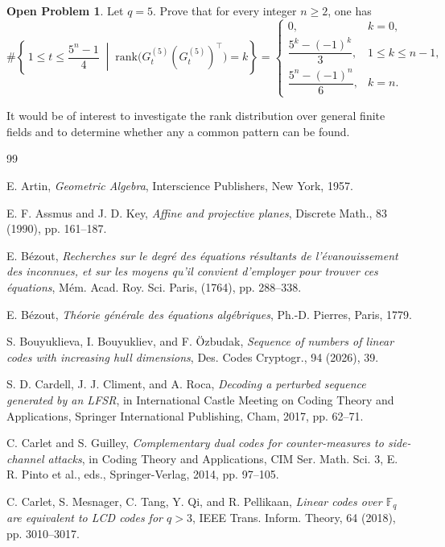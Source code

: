 \documentclass[hidelinks,onefignum,onetabnum]{siamart251216}
\theoremstyle{definition}
\newtheorem{open}[theorem]{Open Problem}
\theoremstyle{remark}
\providecommand{\rank}{{\mathrm{rank}}}
\begin{document}
\begin{open}
Let $q=5$. Prove that for every integer $n\ge 2$, one has
	\[
	\#\left\{\,1\le t\le \frac{5^n-1}{4} \;\middle|\; \rank\!\bigl(G_t^{(5)}(G_t^{(5)})^\top\bigr)=k \right\}
	=
	\begin{cases}
		0, & k=0,\\[1ex]
		\dfrac{5^k-(-1)^k}{3}, & 1\le k\le n-1,\\[2ex]
		\dfrac{5^n-(-1)^n}{6}, & k=n.
	\end{cases}
	\]
\end{open}

It would be of interest to investigate the rank distribution over general finite fields and to determine whether any a common pattern can be found.
	

\begin{thebibliography}{99}
	
	E. Artin, \emph{Geometric Algebra}, Interscience Publishers, New York, 1957.
	
	E. F. Assmus and J. D. Key, \emph{Affine and projective planes}, Discrete Math., 83 (1990), pp. 161--187.
	
	E. B{\'e}zout, \emph{Recherches sur le degr{\'e} des {\'e}quations r{\'e}sultants de l'{\'e}vanouissement des inconnues, et sur les moyens qu'il convient d'employer pour trouver ces {\'e}quations}, M{\'e}m. Acad. Roy. Sci. Paris, (1764), pp. 288--338.
	
	E. B{\'e}zout, \emph{Th{\'e}orie g{\'e}n{\'e}rale des {\'e}quations alg{\'e}briques}, Ph.-D. Pierres, Paris, 1779.
	
	S. Bouyuklieva, I. Bouyukliev, and F. {\"O}zbudak, \emph{Sequence of numbers of linear codes with increasing hull dimensions}, Des. Codes Cryptogr., 94 (2026), 39.
	
	S. D. Cardell, J. J. Climent, and A. Roca, \emph{Decoding a perturbed sequence generated by an LFSR}, in International Castle Meeting on Coding Theory and Applications, Springer International Publishing, Cham, 2017, pp. 62--71.
	
	C. Carlet and S. Guilley, \emph{Complementary dual codes for counter-measures to side-channel attacks}, in Coding Theory and Applications, CIM Ser. Math. Sci. 3, E. R. Pinto et al., eds., Springer-Verlag, 2014, pp. 97--105.
	
	C. Carlet, S. Mesnager, C. Tang, Y. Qi, and R. Pellikaan, \emph{Linear codes over $\mathbb{F}_q$ are equivalent to LCD codes for $q>3$}, IEEE Trans. Inform. Theory, 64 (2018), pp. 3010--3017.
	

\end{thebibliography}
\end{document}

